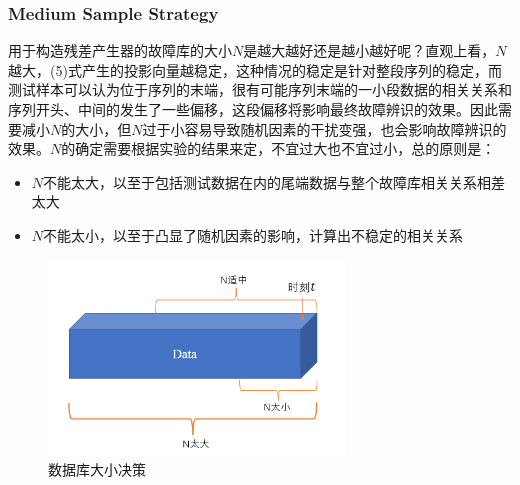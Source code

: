 \documentclass[lang=cn,11pt,a4paper]{elegantpaper}
\begin{document}
\subsubsection{Medium Sample Strategy}
用于构造残差产生器的故障库的大小$N$是越大越好还是越小越好呢？直观上看，$N$越大，(5)式产生的投影向量越稳定，这种情况的稳定是针对整段序列的稳定，而测试样本可以认为位于序列的末端，很有可能序列末端的一小段数据的相关关系和序列开头、中间的发生了一些偏移，这段偏移将影响最终故障辨识的效果。因此需要减小$N$的大小，但$N$过于小容易导致随机因素的干扰变强，也会影响故障辨识的效果。$N$的确定需要根据实验的结果来定，不宜过大也不宜过小，总的原则是：
\begin{itemize}
	\item $N$不能太大，以至于包括测试数据在内的尾端数据与整个故障库相关关系相差太大
	\item $N$不能太小，以至于凸显了随机因素的影响，计算出不稳定的相关关系
\end{itemize}
\begin{figure}[H] %
	\centering %
	\includegraphics[width=0.7\textwidth]{data} %
	\caption{数据库大小决策} %
	\label{Fig.main2} %
\end{figure}
\end{document}
